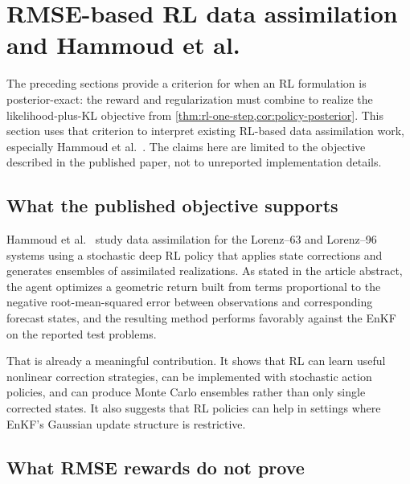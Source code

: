 \documentclass[11pt]{article}
\numberwithin{equation}{section}
\theoremstyle{plain}
\theoremstyle{definition}
\theoremstyle{remark}
\begin{document}
\section{RMSE-based RL data assimilation and Hammoud et al.}
\label{sec:hammoud}

The preceding sections provide a criterion for when an RL formulation is posterior-exact: the reward and regularization must combine to realize the likelihood-plus-KL objective from \cref{thm:rl-one-step,cor:policy-posterior}. This section uses that criterion to interpret existing RL-based data assimilation work, especially Hammoud et al.\ \cite{hammoud2024}. The claims here are limited to the objective described in the published paper, not to unreported implementation details.

\subsection{What the published objective supports}

Hammoud et al.\ \cite{hammoud2024} study data assimilation for the Lorenz--63 and Lorenz--96 systems using a stochastic deep RL policy that applies state corrections and generates ensembles of assimilated realizations. As stated in the article abstract, the agent optimizes a geometric return built from terms proportional to the negative root-mean-squared error between observations and corresponding forecast states, and the resulting method performs favorably against the EnKF on the reported test problems.

That is already a meaningful contribution. It shows that RL can learn useful nonlinear correction strategies, can be implemented with stochastic action policies, and can produce Monte Carlo ensembles rather than only single corrected states. It also suggests that RL policies can help in settings where EnKF's Gaussian update structure is restrictive.

\subsection{What RMSE rewards do not prove}
\end{document}
